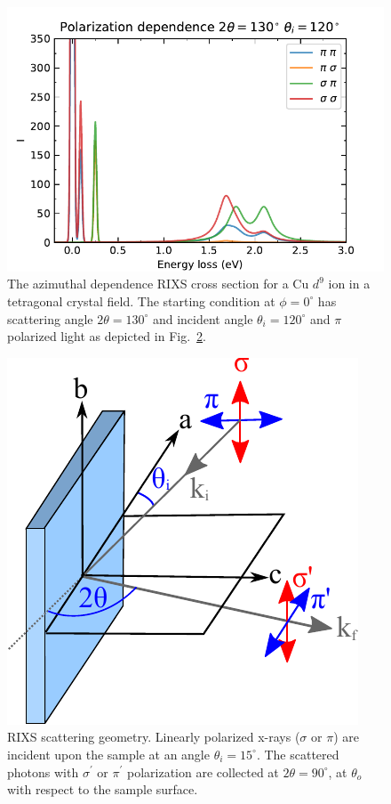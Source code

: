 \documentclass[aps,onecolumn, notitlepage, longbibliography]{revtex4-1}
\begin{document}
\begin{figure}
    \includegraphics{pol_dep.pdf}
    \caption{The azimuthal dependence RIXS cross section for a Cu $d^9$ ion in a tetragonal crystal field. The starting condition at $\phi=0^{\circ}$ has scattering angle $2\theta=130^{\circ}$ and incident angle $\theta_i=120^{\circ}$ and $\pi$ polarized light as depicted in Fig.~\ref{geometry}. \label{pol_dep}}
\end{figure}

\begin{figure}
\includegraphics[width=1.7 in]{geometry.pdf}
\caption{RIXS scattering geometry. Linearly polarized x-rays ($\sigma$ or $\pi$) are incident upon the sample at an angle $\theta _i = 15^\circ$. The scattered photons with $\sigma^\prime$ or $\pi^\prime$ polarization are collected at $2\theta = 90^\circ$, at $\theta_o$ with respect to the sample surface. \label{geometry}}
\end{figure}

\end{document}
